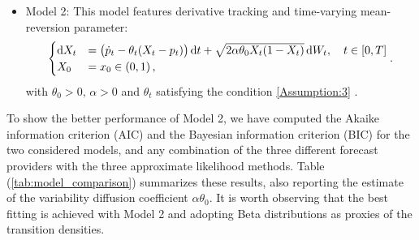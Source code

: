 \documentclass[11pt]{article}
\theoremstyle{definition}
\begin{document}
\begin{itemize}
  \item Model 2: This model features derivative tracking and time-varying mean-reversion parameter:  
\begin{equation}
\begin{cases}
\dif X_t&= \big(\dot{p}_t  - \theta_t (X_t - p_t) \big) \dif t +\sqrt{2 \alpha \theta_0 X_t (1 - X_t)} \dif W_t, \quad t \in [0,T]\\
X_0&=x_0\in (0,1) \,,
\end{cases}.  \label{Model2}
\end{equation}
 with $\theta_0 > 0, \, \alpha > 0$ and $\theta_t$ satisfying the condition \eqref{Assumption:3} .
\end{itemize}
To show the better performance of Model 2, we have computed the Akaike information criterion (AIC) and the Bayesian information criterion (BIC) for the two considered models, and any combination of the three different forecast providers with the three approximate likelihood methods. Table (\ref{tab:model_comparison}) summarizes these results, also reporting the estimate of the variability diffusion coefficient $\alpha \theta_0$. 
It is worth observing that the best fitting is achieved with Model 2 and adopting Beta distributions as proxies of the transition densities.
\end{document}
